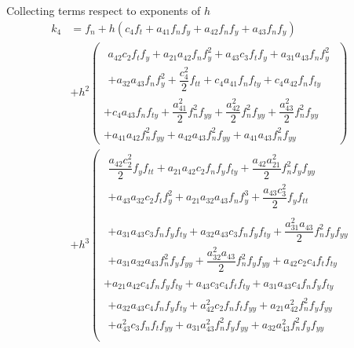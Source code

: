 \documentclass[a4paper,oneside]{book}
\numberwithin{equation}{chapter}
\begin{document}
Collecting terms respect to exponents of $h$
\begin{align}
{k_4} &= {f_n} + h\left( {{c_4}{f_t} + {a_{41}}{f_n}{f_y} + {a_{42}}{f_n}{f_y} + {a_{43}}{f_n}{f_y}} \right)\\
 &+ {h^2}\left( {\begin{array}{*{20}{l}}
\begin{array}{l}
{a_{42}}{c_2}{f_t}{f_y} + {a_{21}}{a_{42}}{f_n}f_y^2 + {a_{43}}{c_3}{f_t}{f_y} + {a_{31}}{a_{43}}{f_n}f_y^2\\
 + {a_{32}}{a_{43}}{f_n}f_y^2 + \dfrac{{c_4^2}}{2}{f_{tt}} + {c_4}{a_{41}}{f_n}{f_{ty}} + {c_4}{a_{42}}{f_n}{f_{ty}}
\end{array}\\
{ + {c_4}{a_{43}}{f_n}{f_{ty}} + \dfrac{{a_{41}^2}}{2}f_n^2{f_{yy}} + \dfrac{{a_{42}^2}}{2}f_n^2{f_{yy}} + \dfrac{{a_{43}^2}}{2}f_n^2{f_{yy}}}\\
{ + {a_{41}}{a_{42}}f_n^2{f_{yy}} + {a_{42}}{a_{43}}f_n^2{f_{yy}} + {a_{41}}{a_{43}}f_n^2{f_{yy}}}
\end{array}} \right)\\
 &+ {h^3}\left( {\begin{array}{*{20}{l}}
\begin{array}{l}
\dfrac{{{a_{42}}c_2^2}}{2}{f_y}{f_{tt}} + {a_{21}}{a_{42}}{c_2}{f_n}{f_y}{f_{ty}} + \dfrac{{{a_{42}}a_{21}^2}}{2}f_n^2{f_y}{f_{yy}}\\
 + {a_{43}}{a_{32}}{c_2}{f_t}f_y^2 + {a_{21}}{a_{32}}{a_{43}}{f_n}f_y^3 + \dfrac{{{a_{43}}c_3^2}}{2}{f_y}{f_{tt}}
\end{array}\\
\begin{array}{l}
 + {a_{31}}{a_{43}}{c_3}{f_n}{f_y}{f_{ty}} + {a_{32}}{a_{43}}{c_3}{f_n}{f_y}{f_{ty}} + \dfrac{{a_{31}^2{a_{43}}}}{2}f_n^2{f_y}{f_{yy}}\\
 + {a_{31}}{a_{32}}{a_{43}}f_n^2{f_y}{f_{yy}} + \dfrac{{a_{32}^2{a_{43}}}}{2}f_n^2{f_y}{f_{yy}} + {a_{42}}{c_2}{c_4}{f_t}{f_{ty}}
\end{array}\\
{ + {a_{21}}{a_{42}}{c_4}{f_n}{f_y}{f_{ty}} + {a_{43}}{c_3}{c_4}{f_t}{f_{ty}} + {a_{31}}{a_{43}}{c_4}{f_n}{f_y}{f_{ty}}}\\
\begin{array}{l}
 + {a_{32}}{a_{43}}{c_4}{f_n}{f_y}{f_{ty}} + a_{42}^2{c_2}{f_n}{f_t}{f_{yy}} + {a_{21}}a_{42}^2f_n^2{f_y}{f_{yy}}\\
 + a_{43}^2{c_3}{f_n}{f_t}{f_{yy}} + {a_{31}}a_{43}^2f_n^2{f_y}{f_{yy}} + {a_{32}}a_{43}^2f_n^2{f_y}{f_{yy}}\\

\end{array}
\end{array}}
\end{align}
\end{document}

